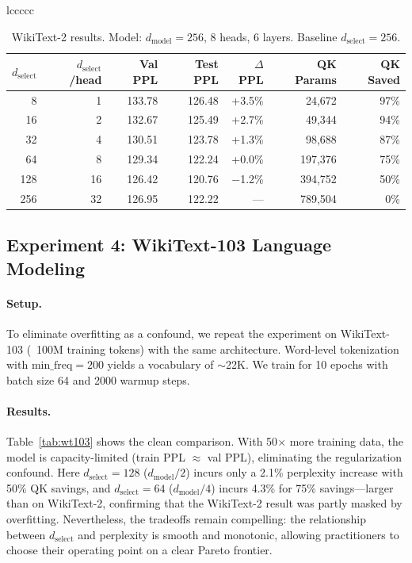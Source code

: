 \documentclass[11pt]{article}
\newcommand{\dmodel}{d_{\text{model}}}
\newcommand{\dselect}{d_{\text{select}}}
\begin{document}
\begin{table}[h]
\begin{tabular}{lccccc}
\begin{table}[h]
\centering
\caption{WikiText-2 results. Model: $\dmodel = 256$, 8 heads, 6 layers. Baseline $\dselect = 256$.}
\label{tab:wt2}
\begin{tabular}{rrrrrrr}
\toprule
$\dselect$ & $\dselect$/head & Val PPL & Test PPL & $\Delta$PPL & QK Params & QK Saved \\
\midrule
8   & 1  & 133.78 & 126.48 & +3.5\%  & 24,672  & 97\% \\
16  & 2  & 132.67 & 125.49 & +2.7\%  & 49,344  & 94\% \\
32  & 4  & 130.51 & 123.78 & +1.3\%  & 98,688  & 87\% \\
64  & 8  & 129.34 & 122.24 & +0.0\%  & 197,376 & 75\% \\
128 & 16 & 126.42 & 120.76 & $-$1.2\% & 394,752 & 50\% \\
256 & 32 & 126.95 & 122.22 & --- & 789,504 & 0\% \\
\bottomrule
\end{tabular}
\end{table}


\subsection{Experiment 4: WikiText-103 Language Modeling}

\paragraph{Setup.}
To eliminate overfitting as a confound, we repeat the experiment on WikiText-103 \citep{merity2017pointer} (~100M training tokens) with the same architecture. Word-level tokenization with $\text{min\_freq} = 200$ yields a vocabulary of $\sim$22K. We train for 10 epochs with batch size 64 and 2000 warmup steps.

\paragraph{Results.}
Table~\ref{tab:wt103} shows the clean comparison. With 50$\times$ more training data, the model is capacity-limited (train PPL $\approx$ val PPL), eliminating the regularization confound. Here $\dselect = 128$ ($\dmodel/2$) incurs only a 2.1\% perplexity increase with 50\% QK savings, and $\dselect = 64$ ($\dmodel/4$) incurs 4.3\% for 75\% savings---larger than on WikiText-2, confirming that the WikiText-2 result was partly masked by overfitting. Nevertheless, the tradeoffs remain compelling: the relationship between $\dselect$ and perplexity is smooth and monotonic, allowing practitioners to choose their operating point on a clear Pareto frontier.


\end{tabular}
\end{table}
\end{document}
